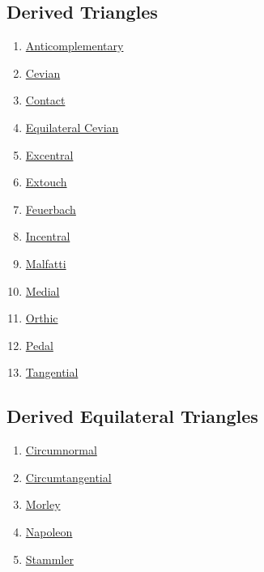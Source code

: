 \documentclass[]{article}
\providecommand{\tightlist}{%
  \setlength{\itemsep}{0pt}\setlength{\parskip}{0pt}}
\begin{document}
\hypertarget{derived-triangles}{%
\subsection{Derived Triangles}\label{derived-triangles}}

\begin{enumerate}
\def\labelenumi{\arabic{enumi}.}
\tightlist
\item
  \href{http://mathworld.wolfram.com/AnticomplementaryTriangle.html}{Anticomplementary}
\item
  \href{http://mathworld.wolfram.com/CevianTriangle.html}{Cevian}
\item
  \href{http://mathworld.wolfram.com/ContactTriangle.html}{Contact}
\item
  \href{http://mathworld.wolfram.com/EquilateralCevianTrianglePoint.html}{Equilateral Cevian}
\item
  \href{http://mathworld.wolfram.com/ExcentralTriangle.html}{Excentral}
\item
  \href{http://mathworld.wolfram.com/ExtouchTriangle.html}{Extouch}
\item
  \href{http://mathworld.wolfram.com/FeuerbachTriangle.html}{Feuerbach}
\item
  \href{http://mathworld.wolfram.com/IncentralTriangle.html}{Incentral}
\item
  \href{http://mathworld.wolfram.com/MalfattiTriangle.html}{Malfatti}
\item
  \href{http://mathworld.wolfram.com/MedialTriangle.html}{Medial}
\item
  \href{http://mathworld.wolfram.com/OrthicTriangle.html}{Orthic}
\item
  \href{http://mathworld.wolfram.com/PedalTriangle.html}{Pedal}
\item
  \href{http://mathworld.wolfram.com/TangentialTriangle.html}{Tangential}
\end{enumerate}

\hypertarget{derived-equilateral-triangles}{%
\subsection{Derived Equilateral Triangles}\label{derived-equilateral-triangles}}

\begin{enumerate}
\def\labelenumi{\arabic{enumi}.}
\tightlist
\item
  \href{http://mathworld.wolfram.com/CircumnormalTriangle.html}{Circumnormal}
\item
  \href{http://mathworld.wolfram.com/CircumtangentialTriangle.html}{Circumtangential}
\item
  \href{http://mathworld.wolfram.com/FirstMorleyTriangle.html}{Morley}
\item
  \href{http://mathworld.wolfram.com/OuterNapoleonTriangle.html}{Napoleon}
\item
  \href{http://mathworld.wolfram.com/StammlerTriangle.html}{Stammler}
\end{enumerate}
\end{document}
